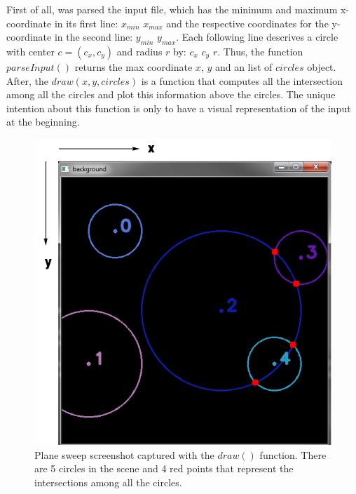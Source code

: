 \documentclass[12pt]{article}
\begin{document}
\noindent First of all, was parsed the input file, which has the minimum and maximum x-coordinate in its first line: $x_{min}$ $x_{max}$ and the respective coordinates for the y-coordinate in the second line: $y_{min}$ $y_{max}$. Each following line descrives a circle with center $c=(c_x, c_y)$ and radius $r$ by: $c_x$ $c_y$ $r$. Thus, the function $parseInput()$ returns the max coordinate $x$, $y$ and an list of $circles$ object. After, the $draw(x,y,circles)$ is a function that computes all the intersection among all the circles and plot this information above the circles. The unique intention about this function is only to have a visual representation of the input at the beginning.

\begin{figure}[H]
	\centering
	\includegraphics[scale=0.45]{img/1.png}
	\caption{Plane sweep screenshot captured with the $draw()$ function. There are 5 circles in the scene and 4 red points that represent the intersections among all the circles.} \label{fig:1b}
\end{figure}
\end{document}
